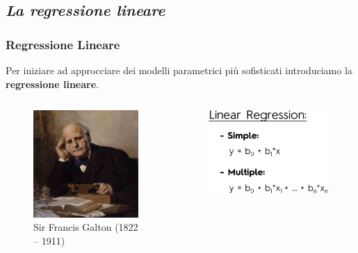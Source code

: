 \subsection[La regressione lineare]{\textit{La regressione lineare}}

\begin{frame}

	\frametitle{Regressione Lineare}
	Per iniziare ad approcciare dei modelli parametrici più sofisticati introduciamo la \textbf{regressione lineare}.

	\begin{columns}

			\begin{figure}[!htbp]
				\centering
				\includegraphics[width=0.8\linewidth]{images/supervised/linear_regression/francis_galton.jpg}
			\caption{Sir Francis Galton (1822 – 1911)}
			\end{figure}

			\begin{figure}[!htbp]
				\centering
				\includegraphics[width=0.85\linewidth]{images/supervised/linear_regression/linear_regression.png}
			\end{figure}

	\end{columns}
\end{frame}


